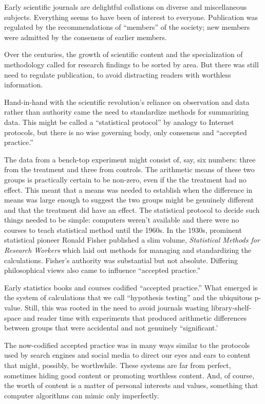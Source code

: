 \documentclass[
  letterpaper,
  DIV=11,
  numbers=noendperiod,
  oneside]{scrreprt}
\begin{document}
Early scientific journals are delightful collations on diverse and
miscellaneous subjects. Everything seems to have been of interest to
everyone. Publication was regulated by the recommendations of
``members'' of the society; new members were admitted by the consensus
of earlier members.

Over the centuries, the growth of scientific content and the
specialization of methodology called for research findings to be sorted
by area. But there was still need to regulate publication, to avoid
distracting readers with worthless information.

Hand-in-hand with the scientific revolution's reliance on observation
and data rather than authority came the need to standardize methods for
summarizing data. This might be called a ``statistical protocol'' by
analogy to Internet protocols, but there is no wise governing body, only
consensus and ``accepted practice.''

The data from a bench-top experiment might consist of, say, six numbers:
three from the treatment and three from controls. The arithmetic means
of these two groups is practically certain to be non-zero, even if the
the treatment had no effect. This meant that a means was needed to
establish when the difference in means was large enough to suggest the
two groups might be genuinely different and that the treatment did have
an effect. The statistical protocol to decide such things needed to be
simple: computers weren't available and there were no courses to teach
statistical method until the 1960s. In the 1930s, prominent statistical
pioneer Ronald Fisher published a slim volume, \emph{Statistical Methods
for Research Workers} which laid out methods for managing and
standardizing the calculations. Fisher's authority was substantial but
not absolute. Differing philosophical views also came to influence
``accepted practice.''

Early statistics books and courses codified ``accepted practice.'' What
emerged is the system of calculations that we call ``hypothesis
testing'' and the ubiquitous p-value. Still, this was rooted in the need
to avoid journals wasting library-shelf-space and reader time with
experiments that produced arithmetic differences between groups that
were accidental and not genuinely ``significant.'

The now-codified accepted practice was in many ways similar to the
protocols used by search engines and social media to direct our eyes and
ears to content that might, possibly, be worthwhile. These systems are
far from perfect, sometimes hiding good content or promoting worthless
content. And, of course, the worth of content is a matter of personal
interests and values, something that computer algorithms can mimic only
imperfectly.
\end{document}
